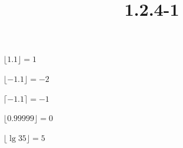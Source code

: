 \documentclass{article}
\title{1.2.4-1}
\begin{document}
\maketitle

\( \lfloor 1.1 \rfloor = 1 \)

\( \lfloor -1.1 \rfloor = -2 \)

\( \lceil -1.1 \rceil = -1 \)

\( \lfloor 0.99999 \rfloor = 0 \)

\( \lfloor \lg{35} \rfloor = 5 \)
\end{document}
